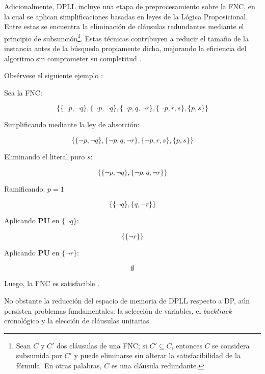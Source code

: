 Adicionalmente, DPLL incluye una etapa de preprocesamiento sobre la FNC, en la cual se aplican simplificaciones basadas en leyes de la L\'ogica Proposicional. Entre estas se encuentra la eliminaci\'on de cl\'ausulas redundantes mediante el principio de subsunci\'on\footnote{Sean $C$ y $C'$ dos cl\'ausulas de una FNC; si $C' \subseteq C$, entonces $C$ se considera subsumida por $C'$ y puede eliminarse sin alterar la satisfacibilidad de la f\'ormula. En otras palabras, $C$ es una cl\'ausula redundante.}. Estas t\'ecnicas contribuyen a reducir el tama\~no de la instancia antes de la b\'usqueda propiamente dicha, mejorando la eficiencia del algoritmo sin comprometer su completitud \cite{garcia-satcap}.

Obsérvese el siguiente ejemplo \cite{garcia-satcap}:

Sea la FNC:

\begin{equation*}
\{\{\neg p,\neg q\},\{\neg p, \neg q\},\{\neg p,q,\neg r\},\{\neg p,r,s\},\{p,s\}\}
\end{equation*}

Simplificando mediante la ley de absorción:

\begin{equation*}
\{\{\neg p,\neg q\},\{\neg p,q,\neg r\},\{\neg p,r,s\},\{p,s\}\}
\end{equation*}

Eliminando el literal puro $s$:

\begin{equation*}
\{\{\neg p,\neg q\},\{\neg p,q,\neg r\}\}
\end{equation*}

Ramificando: $p = 1$

\begin{equation*}
\{\{\neg q\},\{q,\neg r\}\}
\end{equation*}

Aplicando \textbf{PU} en $\{\neg q\}$:

\begin{equation*}
\{\{\neg r\}\}
\end{equation*}

Aplicando \textbf{PU} en $\{\neg r\}$:

\begin{equation*}
\emptyset
\end{equation*}

Luego, la FNC es satisfacible \cite{garcia-satcap}.

No obstante la reducción del espacio de memoria de DPLL respecto a DP, a\'un persisten problemas fundamentales: la selección de variables, el \textit{backtrack} cronológico y la elección de cláusulas unitarias.

